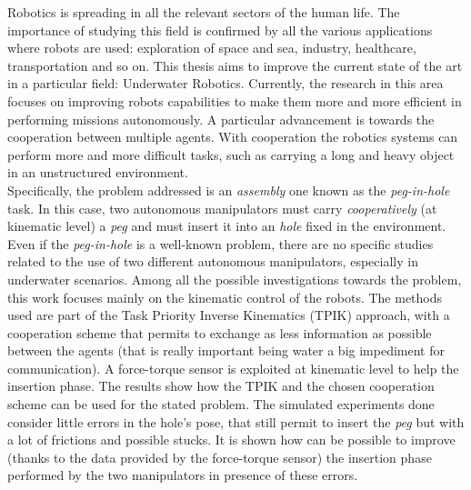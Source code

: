 


\begin{abstracts}

Robotics is spreading in all the relevant sectors of the human life. The importance of studying this field is confirmed by all the various applications where robots are used: exploration of space and sea, industry, healthcare, transportation and so on. This thesis aims to improve the current state of the art in a particular field: Underwater Robotics. Currently, the research in this area focuses on improving robots capabilities to make them more and more efficient in performing missions autonomously. A particular advancement is towards the cooperation between multiple agents. With cooperation the robotics systems can perform more and more difficult tasks, such as carrying a long and heavy object in an unstructured environment.\\
Specifically, the problem addressed is an \textit{assembly} one known as the \mbox{\textit{peg-in-hole}} task. In this case, two autonomous manipulators must carry \textit{cooperatively} (at kinematic level) a \textit{peg} and must insert it into an \textit{hole} fixed in the environment. Even if the \textit{peg-in-hole} is a well-known problem, there are no specific studies related to the use of two different autonomous manipulators, especially in underwater scenarios. Among all the possible investigations towards the problem, this work focuses mainly on the kinematic control of the robots. The methods used are part of the Task Priority Inverse Kinematics (TPIK) approach, with a cooperation scheme that permits to exchange as less information as possible between the agents (that is really important being water a big impediment for communication). A force-torque sensor is exploited at kinematic level to help the insertion phase. The results show how the TPIK and the chosen cooperation scheme can be used for the stated problem. The simulated experiments done consider little errors in the hole's pose, that still permit to insert the \textit{peg} but with a lot of frictions and possible stucks. It is shown how can be possible to improve (thanks to the data provided by the force-torque sensor) the insertion phase performed by the two manipulators in presence of these errors.\\

\end{abstracts}
